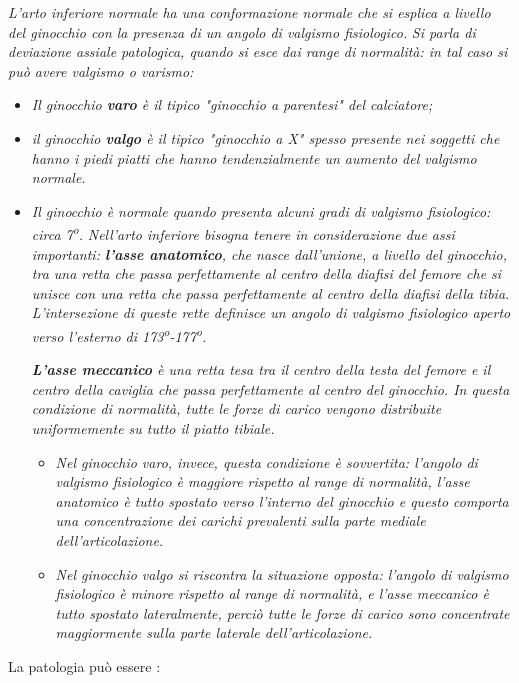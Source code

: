 \emph{L'arto inferiore normale ha una conformazione normale che si esplica a livello del ginocchio con la presenza di un angolo di valgismo fisiologico. }
\emph{Si parla di deviazione assiale patologica, quando si esce dai range di normalità: in tal caso si può avere valgismo o varismo:}

\begin{itemize}
\item
  \emph{Il ginocchio \textbf{varo} è il tipico "ginocchio a parentesi" del calciatore; }
\item
  \emph{il ginocchio \textbf{valgo} è il tipico "ginocchio a X" spesso presente nei soggetti che hanno i piedi piatti che hanno  tendenzialmente un aumento del valgismo normale. }
\item
  \emph{Il ginocchio è normale quando presenta alcuni gradi di valgismo fisiologico: circa 7\textsuperscript{o}. }
\emph{Nell'arto inferiore bisogna tenere in considerazione due assi importanti: \textbf{l'asse anatomico}, che nasce dall'unione, a livello del ginocchio, tra una retta che passa perfettamente al centro della diafisi del femore che si unisce con una retta che passa perfettamente al centro della diafisi della tibia. L'intersezione di queste rette definisce un angolo di valgismo fisiologico aperto verso l'esterno di 173\textsuperscript{o}-177\textsuperscript{o}.}

\emph{\textbf{L'asse meccanico} è una retta tesa tra il centro della testa del femore e il centro della caviglia che passa perfettamente al centro del ginocchio. In questa condizione di normalità, tutte le forze di carico vengono distribuite uniformemente su tutto il piatto tibiale.}
\begin{itemize}
\item \emph{Nel ginocchio varo, invece, questa condizione è sovvertita: l'angolo di valgismo fisiologico è maggiore rispetto al range di
normalità, l'asse anatomico è tutto spostato verso l'interno del ginocchio e questo comporta una concentrazione dei carichi prevalenti sulla parte mediale dell'articolazione. }
\item \emph{Nel ginocchio valgo si riscontra la situazione opposta: l'angolo di valgismo fisiologico è minore rispetto al range di normalità, e l'asse meccanico è tutto spostato lateralmente, perciò tutte le forze di carico sono concentrate maggiormente sulla parte laterale dell'articolazione.}
\end{itemize}
\end{itemize}

La patologia può essere :

